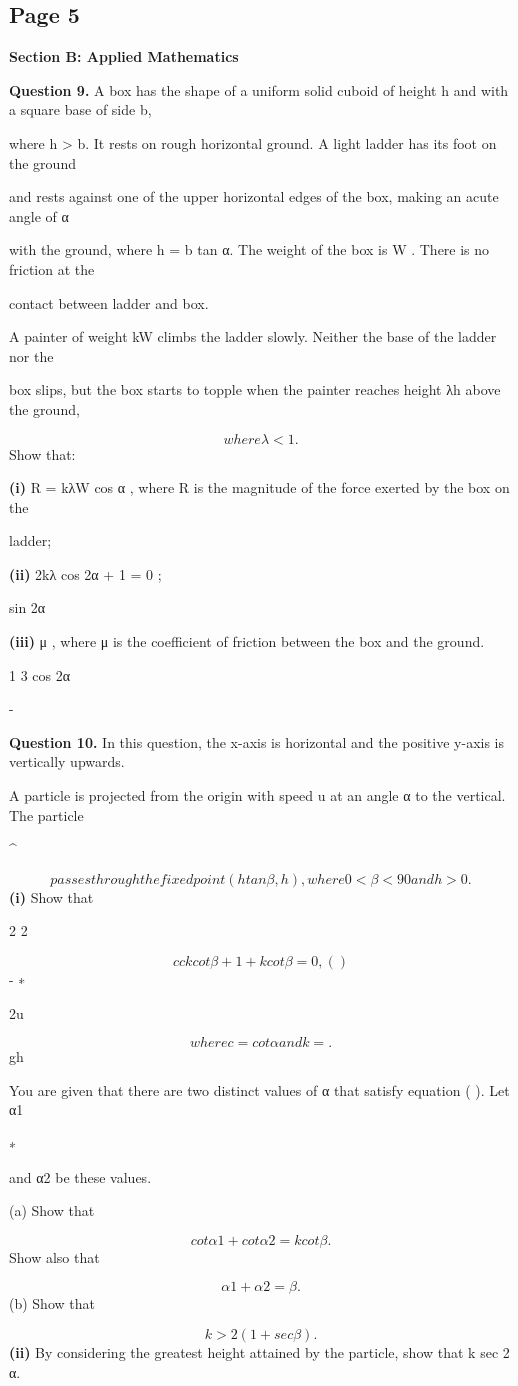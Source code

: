 \documentclass[12pt]{article}
\begin{document}
\subsection*{Page 5}
\begin{flushleft}
\bigskip\textbf{Section B: Applied Mathematics}\par
\bigskip\textbf{Question 9.} A box has the shape of a uniform solid cuboid of height h and with a square base of side b,\par
where h > b. It rests on rough horizontal ground. A light ladder has its foot on the ground\par
and rests against one of the upper horizontal edges of the box, making an acute angle of α\par
with the ground, where h = b tan α. The weight of the box is W . There is no friction at the\par
contact between ladder and box.\par
A painter of weight kW climbs the ladder slowly. Neither the base of the ladder nor the\par
box slips, but the box starts to topple when the painter reaches height λh above the ground,\par
\[where λ < 1 .\]
Show that:\par
\textbf{(i)} R = kλW cos α , where R is the magnitude of the force exerted by the box on the\par
ladder;\par
\textbf{(ii)} 2kλ cos 2α + 1 = 0 ;\par
sin 2α\par
\textbf{(iii)} μ \geq , where μ is the coefficient of friction between the box and the ground.\par
1 3 cos 2α\par
-\par
\bigskip\textbf{Question 10.} In this question, the x-axis is horizontal and the positive y-axis is vertically upwards.\par
A particle is projected from the origin with speed u at an angle α to the vertical. The particle\par
\textasciicircum{}\circ\par
\[passes through the fixed point (h tan β , h), where 0 < β < 90 and h > 0.\]
\textbf{(i)} Show that\par
2 2\par
\[c ck cot β + 1 + k cot β = 0, ( )\]
- ∗\par
2u\par
\[where c = cot α and k = .\]
gh\par
You are given that there are two distinct values of α that satisfy equation ( ). Let α1\par
∗\par
and α2 be these values.\par
(a) Show that\par
\[cot α1 + cot α2 = k cot β.\]
Show also that\par
\[α1 + α2 = β.\]
(b) Show that\par
\[k > 2(1 + sec β).\]
\textbf{(ii)} By considering the greatest height attained by the particle, show that k  sec 2 α.\par
\end{flushleft}
\end{document}
